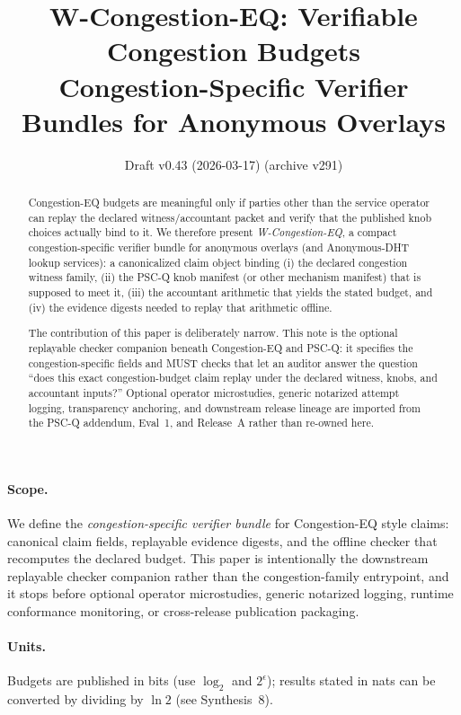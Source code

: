 \documentclass[11pt]{article}
\title{W-Congestion-EQ: Verifiable Congestion Budgets\\
Congestion-Specific Verifier Bundles for Anonymous Overlays}
\author{}
\date{Draft v0.43 (2026-03-17) (archive v291)}
\begin{document}
\maketitle

\begin{abstract}
Congestion-EQ budgets are meaningful only if parties other than the service operator can replay the declared witness/accountant packet and verify that the published knob choices actually bind to it.
We therefore present \emph{W-Congestion-EQ}, a compact congestion-specific verifier bundle for anonymous overlays (and Anonymous-DHT lookup services): a canonicalized claim object binding (i) the declared congestion witness family, (ii) the PSC-Q knob manifest (or other mechanism manifest) that is supposed to meet it, (iii) the accountant arithmetic that yields the stated budget, and (iv) the evidence digests needed to replay that arithmetic offline.

The contribution of this paper is deliberately narrow.
This note is the optional replayable checker companion beneath Congestion-EQ and PSC-Q: it specifies the congestion-specific fields and MUST checks that let an auditor answer the question ``does this exact congestion-budget claim replay under the declared witness, knobs, and accountant inputs?''
Optional operator microstudies, generic notarized attempt logging, transparency anchoring, and downstream release lineage are imported from the PSC-Q addendum, Eval~1, and Release~A rather than re-owned here.
\end{abstract}

\paragraph{Scope.}
We define the \emph{congestion-specific verifier bundle} for Congestion-EQ style claims: canonical claim fields, replayable evidence digests, and the offline checker that recomputes the declared budget.
This paper is intentionally the downstream replayable checker companion rather than the congestion-family entrypoint, and it stops before optional operator microstudies, generic notarized logging, runtime conformance monitoring, or cross-release publication packaging.\cite{series:pscqaddendum,series:evalnotary,series:release,series:abom}

\paragraph{Units.} Budgets are published in bits (use $\log_2$ and $2^{\epsilon}$); results stated in nats can be converted by dividing by $\ln 2$ (see Synthesis~8).\cite{series:notation}
\end{document}
